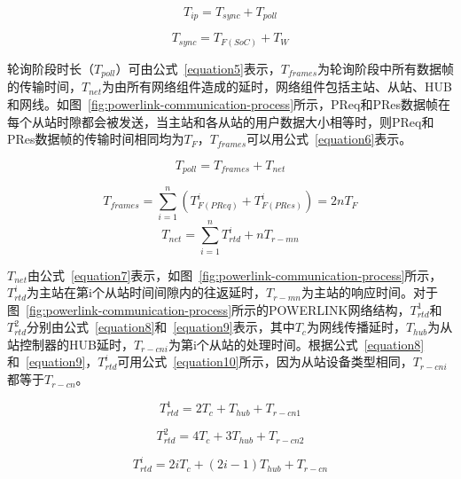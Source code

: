 \begin{equation}
\label{equation3}
T_{ip}=T_{sync}+T_{poll}
\end{equation}

\begin{equation}
\label{equation4}
T_{sync}=T_{F(SoC)}+T_{W}
\end{equation}

轮询阶段时长（$T_{poll}$）可由公式~\ref{equation5}表示，$T_{frames}$为轮询阶段中所有数据帧的传输时间，$T_{net}$为由所有网络组件造成的延时，网络组件包括主站、从站、HUB和网线。如图~\ref{fig:powerlink-communication-process}所示，PReq和PRes数据帧在每个从站时隙都会被发送，当主站和各从站的用户数据大小相等时，则PReq和PRes数据帧的传输时间相同均为$T_{F}$，$T_{frames}$可以用公式~\ref{equation6}表示。

\begin{equation}
\label{equation5}
T_{poll}=T_{frames}+T_{net}
\end{equation}

\begin{equation}
\label{equation6}
T_{frames}=\sum_{i=1}^n(T_{F(PReq)}^{i}+T_{F(PRes)}^{i})=2nT_{F}
\end{equation}
\begin{equation}
\label{equation7}
T_{net}=\sum_{i=1}^nT_{rtd}^{i}+nT_{r-mn}
\end{equation}

$T_{net}$由公式~\ref{equation7}表示，如图~\ref{fig:powerlink-communication-process}所示，$T_{rtd}^{i}$为主站在第i个从站时间间隙内的往返延时，$T_{r-mn}$为主站的响应时间。对于图~\ref{fig:powerlink-communication-process}所示的POWERLINK网络结构，$T_{rtd}^{1}$和$T_{rtd}^{2}$分别由公式~\ref{equation8}和~\ref{equation9}表示，其中$T_{c}$为网线传播延时，$T_{hub}$为从站控制器的HUB延时，$T_{r-cni}$为第i个从站的处理时间。根据公式~\ref{equation8}和~\ref{equation9}，$T_{rtd}^{i}$可用公式~\ref{equation10}所示，因为从站设备类型相同，$T_{r-cni}$都等于$T_{r-cn}$。

\begin{equation}
\label{equation8}
T_{rtd}^{1}=2T_{c}+T_{hub}+T_{r-cn1}
\end{equation}

\begin{equation}
\label{equation9}
T_{rtd}^{2}=4T_{c}+3T_{hub}+T_{r-cn2}
\end{equation}

\begin{equation}
\label{equation10}
T_{rtd}^{i}=2iT_{c}+(2i-1)T_{hub}+T_{r-cn}
\end{equation}

